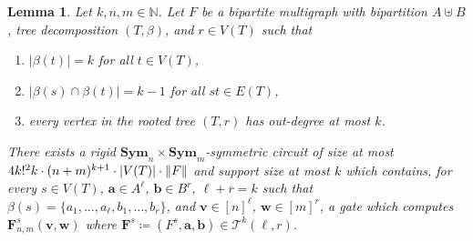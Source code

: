 \documentclass[11pt, DIV=15]{scrarticle}
\theoremstyle{definition}
\theoremstyle{plain}
\newtheorem{lemma}[definition]{Lemma}
\theoremstyle{remark}
\DeclarePairedDelimiter{\norm}{\lVert}{\rVert}
\DeclarePairedDelimiter{\abs}{\lvert}{\rvert}
\newcommand{\Sym}{\mathbf{Sym}}
\begin{document}
 	\begin{lemma} \label{lem:hom-circuit-core-bipartite}
 		Let $k, n, m \in \mathbb{N}$.
 		Let $F$ be a bipartite multigraph with bipartition $A \uplus B$, tree decomposition $(T, \beta)$, and $r \in V(T)$ such that 
 		\begin{enumerate}
 			\item $|\beta(t)| = k$ for all $t \in V(T)$,
 			\item $|\beta(s) \cap \beta(t)| = k-1$ for all $st \in E(T)$, 
			\item every vertex in the rooted tree $(T,r)$ has out-degree at most $k$.
 		\end{enumerate}
 		There exists a rigid $\Sym_n \times \Sym_m$-symmetric circuit of size at most $4  k!^2 k \cdot (n+m)^{k+1} \cdot \abs{V(T)} \cdot \norm{F} $
 		and support size at most $k$
 		which contains, for every 
 		$s \in V(T)$,
 		$\boldsymbol{a} \in A^\ell$,
 		$\boldsymbol{b} \in B^r$,
 		$\ell +r = k$ such that
 		$\beta(s) = \{a_1, \dots, a_\ell, b_1, \dots, b_r\}$, and $\boldsymbol{v} \in [n]^\ell$,
 		$\boldsymbol{w} \in [m]^r$,
 		a gate which computes $\boldsymbol{F}^s_{n,m}(\boldsymbol{v}, \boldsymbol{w})$
 		where $\boldsymbol{F}^s \coloneqq (F^s, \boldsymbol{a}, \boldsymbol{b}) \in \mathcal{T}^{k}(\ell, r)$.
 	\end{lemma}
\end{document}
